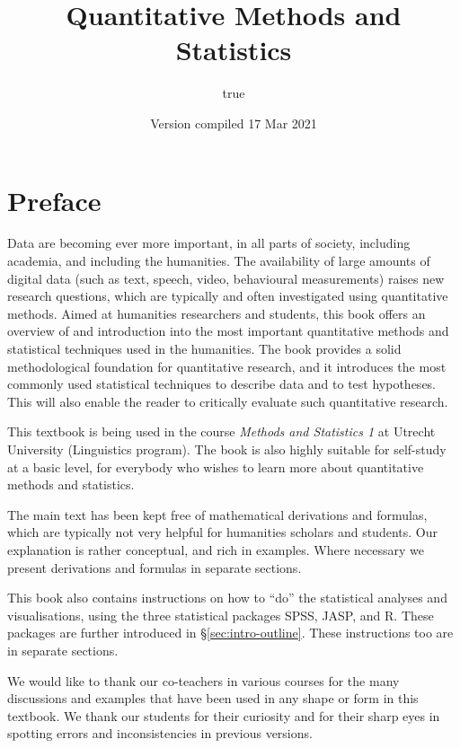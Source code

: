 \documentclass[
]{book}
\title{Quantitative Methods and Statistics}
\author{true}
\date{Version compiled 17 Mar 2021}
\begin{document}
\maketitle

{
\setcounter{tocdepth}{1}
\tableofcontents
}
\hypertarget{preface}{%
\chapter*{Preface}\label{preface}}

Data are becoming ever more important, in all parts of society, including academia, and including the humanities. The availability of large amounts of digital data (such as text, speech, video, behavioural measurements) raises new research questions, which are typically and often investigated using quantitative methods.
Aimed at humanities researchers and students, this book offers an overview of and introduction into the most important quantitative methods and statistical techniques used in the humanities. The book provides a solid methodological foundation for quantitative research, and it introduces the most commonly used statistical techniques to describe data and to test hypotheses. This will also enable the reader to critically evaluate such quantitative research.

This textbook is being used in the course \emph{Methods and Statistics 1} at Utrecht University (Linguistics program). The book is also highly suitable for self-study at a basic level, for everybody who wishes to learn more about quantitative methods and statistics.

The main text has been kept free of mathematical derivations and formulas, which are typically not very helpful for humanities scholars and students. Our explanation is rather conceptual, and rich in examples. Where necessary we present derivations and formulas in separate sections.

This book also contains instructions on how to ``do'' the statistical analyses and visualisations, using the three statistical packages SPSS, JASP, and R. These packages are further introduced in §\ref{sec:intro-outline}. These instructions too are in separate sections.

We would like to thank our co-teachers in various courses for the many discussions and examples that have been used in any shape or form in this textbook. We thank our students for their curiosity and for their sharp eyes in spotting errors and inconsistencies in previous versions.
\end{document}
